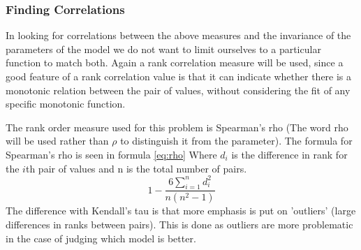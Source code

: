 \documentclass{scrartcl}
\newcommand\todo[1]{\textit{\textcolor{red}{#1}}}
\begin{document}
\subsubsection{Finding Correlations}
In looking for correlations between the above measures and the invariance of the parameters of the model we do not want to limit ourselves to a particular function to match both. Again a rank correlation measure will be used, since a good feature of a rank correlation value is that it can indicate whether there is a monotonic relation between the pair of values, without considering the fit of any specific monotonic function. 
 
The rank order measure used for this problem is Spearman's rho (The word rho will be used rather than $\rho$ to distinguish it from the parameter). The formula for Spearman's rho is seen in formula \ref{eq:rho} Where $d_{i}$ is the difference in rank for the $i$th pair of values and n is the total number of pairs.
\begin{equation}
\label{eq:rho}
1-\frac{6 \sum\limits_{i=1}^n d_{i}^{2}}{n(n^{2}-1)} 
\end{equation}
The difference with Kendall's tau is that more emphasis is put on 'outliers' (large differences in ranks between pairs). This is done as outliers are more problematic in the case of judging which model is better.

\end{document}
